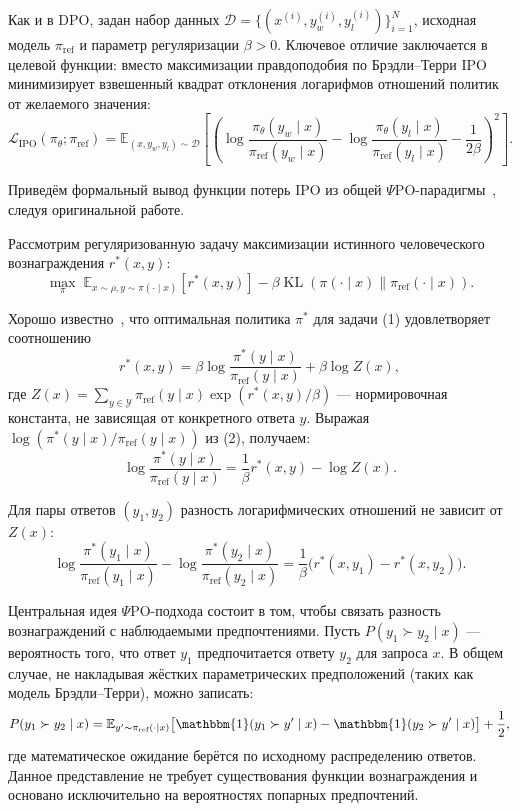 \documentclass[a4paper,12pt]{article}
\begin{document}
Как и в DPO, задан набор данных $\mathcal{D} = \{(x^{(i)}, y_w^{(i)}, y_l^{(i)})\}_{i=1}^N$, исходная модель $\pi_{\text{ref}}$ и параметр регуляризации $\beta > 0$. Ключевое отличие заключается в целевой функции: вместо максимизации правдоподобия по Брэдли–Терри IPO минимизирует взвешенный квадрат отклонения логарифмов отношений политик от желаемого значения:
\[
\mathcal{L}_{\text{IPO}}(\pi_\theta; \pi_{\text{ref}}) = \mathbb{E}_{(x, y_w, y_l) \sim \mathcal{D}} \left[ \left( \log \frac{\pi_\theta(y_w \mid x)}{\pi_{\text{ref}}(y_w \mid x)} - \log \frac{\pi_\theta(y_l \mid x)}{\pi_{\text{ref}}(y_l \mid x)} - \frac{1}{2\beta} \right)^2 \right].
\]


Приведём формальный вывод функции потерь IPO из общей $\Psi$PO-парадигмы~\cite{azar2024general}, следуя оригинальной работе.

Рассмотрим регуляризованную задачу максимизации истинного человеческого вознаграждения $r^*(x, y)$:
\[
\max_{\pi} \; \mathbb{E}_{x \sim \rho, y \sim \pi(\cdot \mid x)} [r^*(x, y)] - \beta \operatorname{KL}(\pi(\cdot \mid x) \| \pi_{\text{ref}}(\cdot \mid x)). \tag{1}
\]

Хорошо известно~\cite{rafailov2023direct}, что оптимальная политика $\pi^*$ для задачи (1) удовлетворяет соотношению
\[
r^*(x, y) = \beta \log \frac{\pi^*(y \mid x)}{\pi_{\text{ref}}(y \mid x)} + \beta \log Z(x), \tag{2}
\]
где $Z(x) = \sum_{y \in \mathcal{Y}} \pi_{\text{ref}}(y \mid x) \exp(r^*(x, y)/\beta)$ — нормировочная константа, не зависящая от конкретного ответа $y$. Выражая $\log(\pi^*(y \mid x) / \pi_{\text{ref}}(y \mid x))$ из (2), получаем:
\[
\log \frac{\pi^*(y \mid x)}{\pi_{\text{ref}}(y \mid x)} = \frac{1}{\beta} r^*(x, y) - \log Z(x). \tag{3}
\]

Для пары ответов $(y_1, y_2)$ разность логарифмических отношений не зависит от $Z(x)$:
\[
\log \frac{\pi^*(y_1 \mid x)}{\pi_{\text{ref}}(y_1 \mid x)} - \log \frac{\pi^*(y_2 \mid x)}{\pi_{\text{ref}}(y_2 \mid x)} = \frac{1}{\beta} \bigl( r^*(x, y_1) - r^*(x, y_2) \bigr). \tag{4}
\]

Центральная идея $\Psi$PO-подхода состоит в том, чтобы связать разность вознаграждений с наблюдаемыми предпочтениями. Пусть $P(y_1 \succ y_2 \mid x)$ — вероятность того, что ответ $y_1$ предпочитается ответу $y_2$ для запроса $x$. В общем случае, не накладывая жёстких параметрических предположений (таких как модель Брэдли–Терри), можно записать:
\[
P(y_1 \succ y_2 \mid x) = \mathbb{E}_{y' \sim \pi_{\text{ref}}(\cdot \mid x)} \bigl[ \mathbbm{1}(y_1 \succ y' \mid x) - \mathbbm{1}(y_2 \succ y' \mid x) \bigr] + \frac{1}{2},
\]
где математическое ожидание берётся по исходному распределению ответов. Данное представление не требует существования функции вознаграждения и основано исключительно на вероятностях попарных предпочтений.
\end{document}
